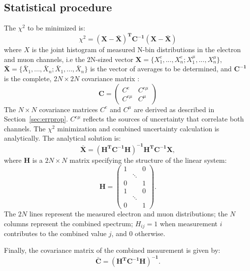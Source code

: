 

\subsection{Statistical procedure}

The $\chi^2$ to be minimized is:
\begin{equation}
  \chi^2 = \bm{(X - \bar{X})^T C^{-1} (X - \bar{X})}
\end{equation}
where $X$ is the joint histogram of measured N-bin distributions in the electron and muon channels, i.e
the 2N-sized vector $\bm{X} = \{X_1^e, ..., X_n^e ; X_1^\mu , ..., X_n^\mu\}$, $\bm{\bar{X}} = \{\bar{X}_1 , ..., \bar{X}_n ; \bar{X}_1 , ..., \bar{X}_n\}$ is the vector of averages to be
determined, and $\bm{C^{-1}}$ is the complete, $2N\times 2N$ covariance matrix :
\begin{equation}
  \bm{C} =
  \begin{pmatrix}
    C^e & C^{e\mu} \\
    C^{e\mu} & C^\mu
  \end{pmatrix}
\end{equation}
The $N\times N$ covariance matrices $C^e$ and $C^\mu$ are derived as described in Section~\ref{sec:errprop}. $C^{e\mu}$ reflects the sources of uncertainty that correlate both channels.
The $\chi^2$ minimization and combined uncertainty calculation is analytically. The analytical solution is:
\begin{equation}
  \bm{\bar{X} = (H^T C^{-1} H)^{-1} H^T C^{-1} X},
\end{equation}
where $\bm H$ is a $2N \times N$ matrix specifying the structure of the linear system:
\begin{equation}
  \bm{H} =
  \begin{pmatrix}
    1 & & 0 \\
    & \ddots & \\
    0 & & 1 \\
    1 & & 0 \\
    & \ddots & \\
    0 & & 1
  \end{pmatrix}.
\end{equation}
The $2N$ lines represent the measured electron and muon distributions; the $N$ columns represent the combined spectrum; $H_{ij}=1$ when measurement $i$ contributes to the combined value $j$, and 0 otherwise.


Finally, the covariance matrix of the combined meaurement is given by:
\begin{equation}
  \bm{\bar{C} = (H^T C^{-1} H)^{-1}}.
\end{equation}


